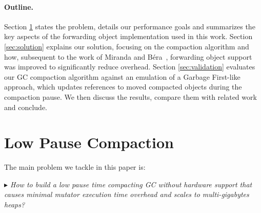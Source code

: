 \documentclass[sigplan,10pt,screen]{acmart}\settopmatter{printfolios=true,printccs=true,printacmref=true}
\newcommand{\cba}[1]{\color{purple}\fbox{\bfseries\sffamily\scriptsize Clement:}{\sf\small$\blacktriangleright$\textit{#1}$\blacktriangleleft$}\color{black}}
\begin{document}
\paragraph{Outline.}
Section \ref{sec:problem} states the problem, details our performance goals and summarizes the key aspects of the forwarding object implementation used in this work. Section \ref{sec:solution} explains our solution, focusing on the compaction algorithm and how, subsequent to the work of Miranda and B\'era~\cite{Forwarders}, forwarding object support was improved to significantly reduce overhead. Section \ref{sec:validation} evaluates our GC compaction algorithm against an emulation of a Garbage First-like approach, which updates references to moved compacted objects during the compaction pause. We then discuss the results, compare them with related work and conclude.

\section{Low Pause Compaction}
\label{sec:problem}


The main problem we tackle in this paper is: 

\emph{$\blacktriangleright$ How to build a low pause time compacting GC without hardware support that causes minimal mutator execution time overhead and scales to multi-gigabytes heaps?} 


\end{document}
